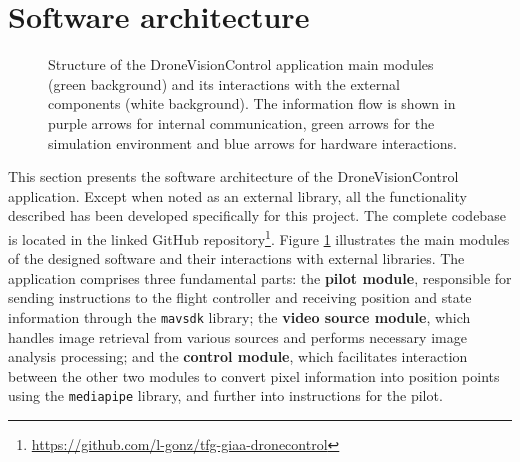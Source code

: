 \section{Software architecture}

\begin{figure}
  \centering
  \caption{Structure of the DroneVisionControl application main modules (green background) and its interactions with the external components (white background). The information flow is shown in purple arrows for internal communication, green arrows for the simulation environment and blue arrows for hardware interactions.}
\label{fig:soft-arch}
\end{figure}

This section presents the software architecture of the DroneVisionControl application. Except when noted as an external library, all the functionality described has been developed specifically for this project. The complete codebase is located in the linked GitHub repository\footnote{\url{https://github.com/l-gonz/tfg-giaa-dronecontrol}}.
Figure \ref{fig:soft-arch} illustrates the main modules of the designed software and their interactions with external libraries. The application comprises three fundamental parts: the \textbf{pilot module}, responsible for sending instructions to the flight controller and receiving position and state information through the \texttt{mavsdk} library; the \textbf{video source module}, which handles image retrieval from various sources and performs necessary image analysis processing; and the \textbf{control module}, which facilitates interaction between the other two modules to convert pixel information into position points using the \texttt{mediapipe} library, and further into instructions for the pilot.

